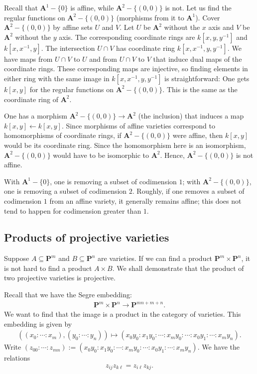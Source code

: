 \documentclass [11 pt, oneside, margin = 1 in] {article}
\begin{document}
\begin{example}[ ]\label{}\text{}
Recall that $\mathbf{A}^1-\{0\}$ is affine, while $\mathbf{A}^2 - \{(0,0)\}$ is not. Let us find the regular functions on $\mathbf{A}^2 - \{(0,0)\}$ (morphisms from it to $\mathbf{A}^1$). Cover $\mathbf{A}^2-\{(0,0)\}$ by affine sets $U$ and $V$. Let $U$ be $\mathbf{A}^2$ without the $x$ axis and $V$ be $\mathbf{A}^2$ without the $y$ axis. The corresponding coordinate rings are $k[x,y,y^{-1}]$ and $k[x,x^{-1},y]$. The intersection $U\cap V$ has coordinate ring $k[x,x^{-1},y,y^{-1}]$. We have maps from $U\cap V$ to $U$ and from $U\cap V$ to $V$ that induce dual maps of the coordinate rings. These corresponding maps are injective, so finding elements in either ring with the same image in $k[x,x^{-1},y,y^{-1}]$ is straightforward: One gets $k[x,y]$ for the regular functions on $\mathbf{A}^2-\{(0,0)\}$. This is the same as the coordinate ring of $\mathbf{A}^2$.

One has a morphism $\mathbf{A}^2-\{(0,0)\}\longrightarrow \mathbf{A}^2$ (the inclusion) that induces a map $k[x,y] \longleftarrow k[x,y]$. Since morphisms of affine varieties correspond to homomorphisms of coordinate rings, if $\mathbf{A}^2-\{(0,0)\}$ were affine, then $k[x,y]$ would be its coordinate ring. Since the homomorphism here is an isomorphism, $\mathbf{A}^2-\{(0,0)\}$ would have to be isomorphic to $\mathbf{A}^2$. Hence, $\mathbf{A}^2-\{(0,0)\}$ is not affine.
\end{example}

\begin{remark}
	With $\mathbf{A}^1-\{0\}$, one is removing a subset of codimension $1$; with $\mathbf{A}^2-\{(0,0)\}$, one is removing a subset of codimension $2$. Roughly, if one removes a subset of codimension $1$ from an affine variety, it generally remains affine; this does not tend to happen for codimension greater than $1$.
\end{remark}


\subsection{Products of projective varieties}
Suppose $A\subseteq \mathbf{P}^m$ and $B\subseteq \mathbf{P}^n$ are varieties. If we can find a product $\mathbf{P}^m\times \mathbf{P}^n$, it is not hard to find a product $A\times B$. We shall demonstrate that the product of two projective varieties is projective.

Recall that we have the Segre embedding:
\begin{align*}
	\mathbf{P}^m\times \mathbf{P}^n\longrightarrow \mathbf{P}^{mn+m+n}.
\end{align*}
We want to find that the image is a product in the category of varieties. This embedding is given by
\begin{align*}
	((x_0:\cdots:x_m), (y_0:\cdots:y_n))\longmapsto (x_0y_0:x_1y_0:\cdots:x_my_0:\cdots: x_0y_1:\cdots:x_my_n).
\end{align*}
Write $(z_{00}:\cdots:z_{mn}):=(x_0y_0:x_1y_0:\cdots:x_my_0:\cdots: x_0y_1:\cdots:x_my_n)$. We have the relations
\begin{align*}
	z_{ij}z_{k\ell} = z_{i\ell}z_{kj}.
\end{align*}
\end{document}

